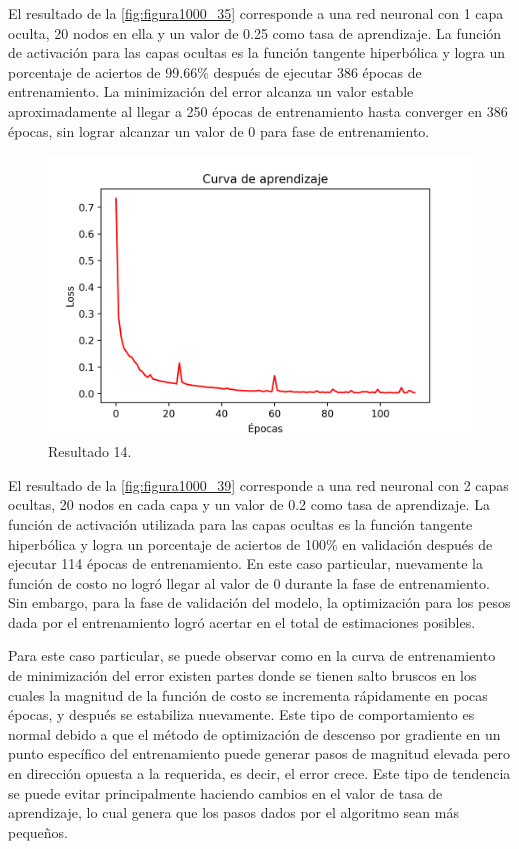 El resultado de la \autoref{fig:figura1000_35} corresponde a una red neuronal con 1 capa oculta, 20 nodos en ella y un valor de 0.25 como tasa de aprendizaje. La función de activación para las capas ocultas es la 
función tangente hiperbólica y logra un porcentaje de aciertos de 99.66$\%$ después de ejecutar 386 épocas de entrenamiento. La minimización del error alcanza un valor estable aproximadamente al llegar a 250 épocas de 
entrenamiento hasta converger en 386 épocas, sin lograr alcanzar un valor de 0 para fase de entrenamiento.

\begin{figure}[h]
	\centering
	\includegraphics[scale=0.71]{imgss189.png}
	\caption{Resultado 14.}
	\label{fig:figura1000_39}
\end{figure} 

El resultado de la \autoref{fig:figura1000_39} corresponde a una red neuronal con 2 capas ocultas, 20 nodos en cada capa y un valor de 0.2 como tasa de aprendizaje. La función de activación utilizada para las capas ocultas es la 
función tangente hiperbólica y logra un porcentaje de aciertos de 100$\%$ en validación después de ejecutar 114 épocas de entrenamiento. En este caso particular, nuevamente la función de costo no logró llegar al valor de 0 
durante la fase de entrenamiento. Sin embargo, para la fase de validación del modelo, la optimización para los pesos dada por el entrenamiento logró acertar en el total de estimaciones posibles. 

Para este caso particular, se puede observar como en la curva de entrenamiento de minimización del error existen partes donde se tienen salto bruscos en los cuales la magnitud de la función de costo se incrementa rápidamente 
en pocas épocas, y después se estabiliza nuevamente. Este tipo de comportamiento es normal debido a que el método de optimización de descenso por gradiente en un punto específico del entrenamiento puede generar pasos de 
magnitud elevada pero en dirección opuesta a la requerida, es decir, el error crece. Este tipo de tendencia se puede evitar principalmente haciendo cambios en el valor de tasa de aprendizaje, lo cual genera que los pasos 
dados por el algoritmo sean más pequeños.

